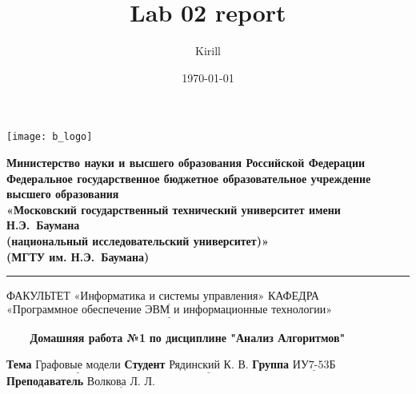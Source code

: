 

\title{Lab 02 report}
\author{Kirill}

\date{\today}


\thispagestyle{empty}

\noindent \begin{minipage}{0.15\textwidth}
	\texttt{[image: b\_logo]}
\end{minipage}
\noindent\begin{minipage}{0.85\textwidth}\centering
	\textbf{Министерство науки и высшего образования Российской Федерации}\\
	\textbf{Федеральное государственное бюджетное образовательное учреждение высшего образования}\\
	\textbf{«Московский государственный технический университет имени Н.Э.~Баумана}\\
	\textbf{(национальный исследовательский университет)»}\\
	\textbf{(МГТУ им. Н.Э.~Баумана)}
\end{minipage}

\noindent\rule{16cm}{3pt}
\newline\newline
\noindent ФАКУЛЬТЕТ $\underline{\text{«Информатика и системы управления»}}$ \newline\newline
\noindent КАФЕДРА $\underline{\text{«Программное обеспечение ЭВМ и информационные технологии»}}$\newline


\begin{center}
	\noindent\begin{minipage}{1.3\textwidth}\centering
	\Large\textbf{   ~~~ Домашняя работа №1}\newline
	\textbf{по дисциплине "Анализ Алгоритмов"}\newline\newline\newline
	\end{minipage}
\end{center}

\noindent\textbf{Тема} $\underline{\text{Графовые модели}}$\newline\newline
\noindent\textbf{Студент} $\underline{\text{Рядинский К. В.}}$\newline\newline
\noindent\textbf{Группа} $\underline{\text{ИУ7-53Б}}$\newline\newline
\noindent\textbf{Преподаватель} $\underline{\text{Волкова Л. Л.}}$\newline

